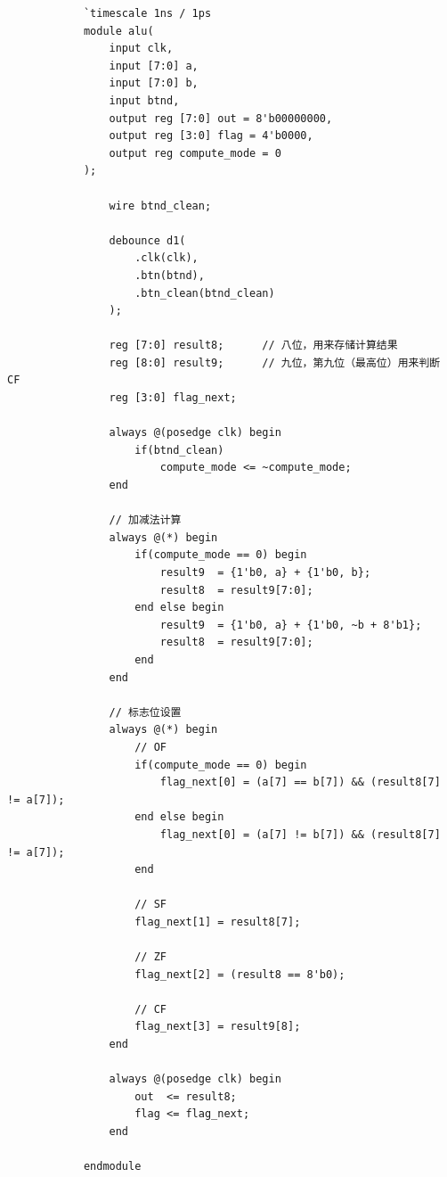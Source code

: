 \documentclass{SYSUReport}
\begin{document}
\begin{enumerate}[label={\chinese*、},labelsep=0pt]
\begin{enumerate}[label = \arabic*、]
        \begin{verbatim}
            `timescale 1ns / 1ps
            module alu(
                input clk,
                input [7:0] a,
                input [7:0] b,
                input btnd,
                output reg [7:0] out = 8'b00000000,
                output reg [3:0] flag = 4'b0000,
                output reg compute_mode = 0
            );

                wire btnd_clean;

                debounce d1(
                    .clk(clk),
                    .btn(btnd),
                    .btn_clean(btnd_clean)
                );

                reg [7:0] result8;      // 八位，用来存储计算结果
                reg [8:0] result9;      // 九位，第九位（最高位）用来判断 CF
                reg [3:0] flag_next;

                always @(posedge clk) begin
                    if(btnd_clean)
                        compute_mode <= ~compute_mode;
                end

                // 加减法计算
                always @(*) begin
                    if(compute_mode == 0) begin
                        result9  = {1'b0, a} + {1'b0, b};   
                        result8  = result9[7:0];            
                    end else begin
                        result9  = {1'b0, a} + {1'b0, ~b + 8'b1};
                        result8  = result9[7:0];
                    end
                end

                // 标志位设置
                always @(*) begin
                    // OF
                    if(compute_mode == 0) begin
                        flag_next[0] = (a[7] == b[7]) && (result8[7] != a[7]);
                    end else begin
                        flag_next[0] = (a[7] != b[7]) && (result8[7] != a[7]);
                    end

                    // SF
                    flag_next[1] = result8[7];

                    // ZF
                    flag_next[2] = (result8 == 8'b0);

                    // CF
                    flag_next[3] = result9[8];
                end

                always @(posedge clk) begin
                    out  <= result8;
                    flag <= flag_next;
                end

            endmodule



\end{verbatim}
\end{enumerate}
\end{enumerate}
\end{document}
